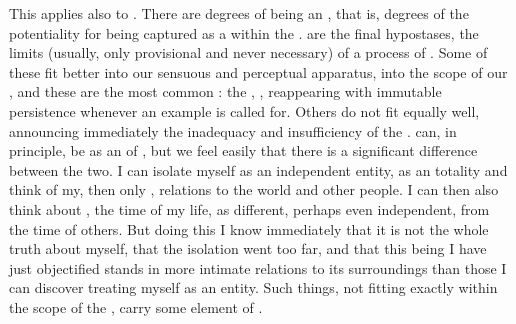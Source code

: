 This applies also to .  There are degrees of being an
, that is, degrees of the potentiality for being captured as a
 within the \hoa.  are the final hypostases, the
 limits (usually, only provisional and never necessary) of a process
of .  Some of these  fit better
into our sensuous and perceptual apparatus, into the scope of our \hoa, and
these are the most common : the , ,
 reappearing with immutable persistence whenever an example is
called for. Others do not fit equally well, announcing immediately the
inadequacy and insufficiency of the .   can, in principle, be  as an  of
, but we feel easily that there is a significant difference
between the two.  I can isolate myself as an independent entity, as an
 totality and think of my, then only , relations to
the world and other people. I can then also think about , the time
of my life, as different, perhaps even independent, from the time of others. But
doing this I know immediately that it is not the whole truth about myself, that
the isolation went too far, and that this being I have just {objectified} stands
in more intimate relations to its surroundings than those I can discover
treating myself as an  entity. Such things, not fitting exactly
within the scope of the \hoa, carry some element of .

